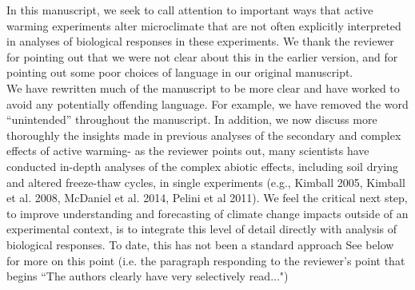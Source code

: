 \documentclass[11pt,a4paper]{letter}
\begin{document}
\begin{letter}{}
In this manuscript, we seek to call attention to important ways that active warming experiments alter microclimate that are not often explicitly interpreted in analyses of biological responses in these experiments. We thank the reviewer for pointing out that we were not clear about this in the earlier version, and for pointing out some poor choices of language in our original manuscript. \\

We have rewritten much of the manuscript to be more clear and have worked to avoid any potentially offending language. For example, we have removed the word ``unintended'' throughout the manuscript. In addition, we now discuss more thoroughly the insights made in previous analyses of the secondary and complex effects of active warming- as the reviewer points out, many scientists have conducted in-depth analyses of the complex abiotic effects, including soil drying and altered freeze-thaw cycles, in single experiments (e.g., Kimball 2005, Kimball et al. 2008, McDaniel et al. 2014, Pelini et al 2011). We feel the critical next step, to improve understanding and  forecasting of climate change impacts outside of an experimental context, is to integrate this level of detail directly with analysis of biological responses. To date, this has not been a standard approach See below for more on this point (i.e. the paragraph responding to the reviewer's point that begins ``The authors clearly have very selectively read...")


\end{letter}
\end{document}
